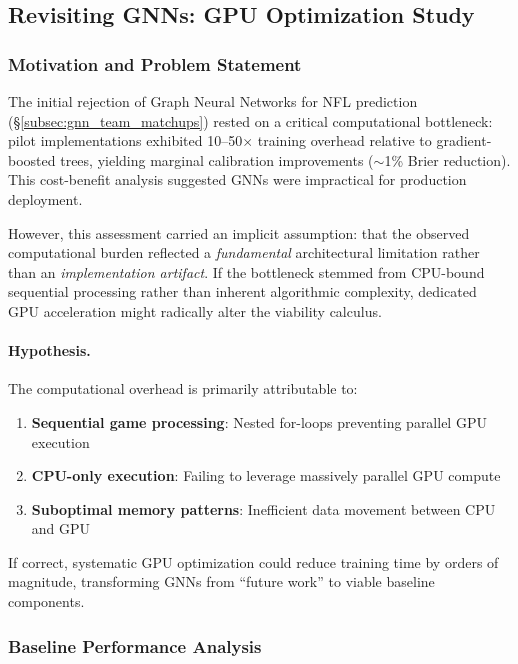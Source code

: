 \subsection{Revisiting GNNs: GPU Optimization Study}
\label{subsec:gnn_gpu_optimization}

\subsubsection{Motivation and Problem Statement}

The initial rejection of Graph Neural Networks for NFL prediction (\S\ref{subsec:gnn_team_matchups}) rested on a critical computational bottleneck: pilot implementations exhibited 10--50$\times$ training overhead relative to gradient-boosted trees, yielding marginal calibration improvements ($\sim$1\% Brier reduction). This cost-benefit analysis suggested GNNs were impractical for production deployment.

However, this assessment carried an implicit assumption: that the observed computational burden reflected a \textit{fundamental} architectural limitation rather than an \textit{implementation artifact}. If the bottleneck stemmed from CPU-bound sequential processing rather than inherent algorithmic complexity, dedicated GPU acceleration might radically alter the viability calculus.

\paragraph{Hypothesis.} The computational overhead is primarily attributable to:
\begin{enumerate}
    \item \textbf{Sequential game processing}: Nested for-loops preventing parallel GPU execution
    \item \textbf{CPU-only execution}: Failing to leverage massively parallel GPU compute
    \item \textbf{Suboptimal memory patterns}: Inefficient data movement between CPU and GPU
\end{enumerate}

If correct, systematic GPU optimization could reduce training time by orders of magnitude, transforming GNNs from ``future work'' to viable baseline components.

\subsubsection{Baseline Performance Analysis}

